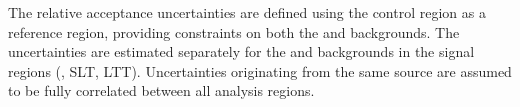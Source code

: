 



The relative acceptance uncertainties are defined using the \ZHF
control region as a reference region, providing constraints on both
the \ZHF and \ttbar backgrounds. The uncertainties are estimated
separately for the \ZHF and \ttbar backgrounds in the signal regions
(\hadhad, \lephad SLT, \lephad LTT). Uncertainties originating from
the same source are assumed to be fully correlated between all
analysis regions.

